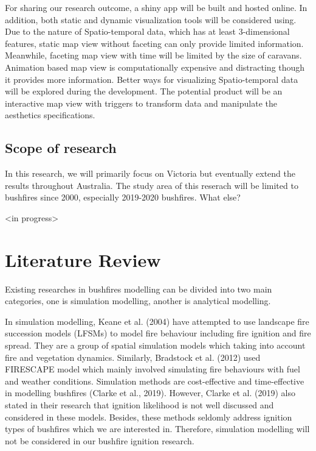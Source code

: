 \documentclass{monashthesis}
\begin{document}
For sharing our research outcome, a shiny app will be built and hosted
online. In addition, both static and dynamic visualization tools will be
considered using. Due to the nature of Spatio-temporal data, which has
at least 3-dimensional features, static map view without faceting can
only provide limited information. Meanwhile, faceting map view with time
will be limited by the size of caravans. Animation based map view is
computationally expensive and distracting though it provides more
information. Better ways for visualizing Spatio-temporal data will be
explored during the development. The potential product will be an
interactive map view with triggers to transform data and manipulate the
aesthetics specifications.

\section{Scope of research}\label{scope-of-research}

In this research, we will primarily focus on Victoria but eventually
extend the results throughout Australia. The study area of this reserach
will be limited to bushfires since 2000, especially 2019-2020 bushfires.
What else?

\textless{}in progress\textgreater{}

\chapter{Literature Review}\label{literature-review}

Existing researches in bushfires modelling can be divided into two main
categories, one is simulation modelling, another is analytical
modelling.

In simulation modelling, Keane et al. (2004) have attempted to use
landscape fire succession models (LFSMs) to model fire behaviour
including fire ignition and fire spread. They are a group of spatial
simulation models which taking into account fire and vegetation
dynamics. Similarly, Bradstock et al. (2012) used FIRESCAPE model which
mainly involved simulating fire behaviours with fuel and weather
conditions. Simulation methods are cost-effective and time-effective in
modelling bushfires (Clarke et al., 2019). However, Clarke et al. (2019)
also stated in their research that ignition likelihood is not well
discussed and considered in these models. Besides, these methods
seldomly address ignition types of bushfires which we are interested in.
Therefore, simulation modelling will not be considered in our bushfire
ignition research.
\end{document}
